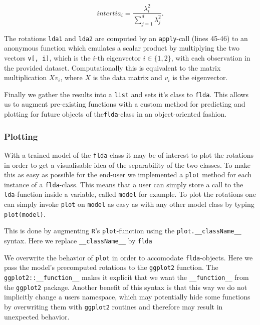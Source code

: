 \documentclass{article}
\begin{document}
\begin{equation}
intertia_i = \frac{\lambda_i^2}{\sum_{j=1}^{d}\lambda_{j}^{2}}.
\end{equation}

The rotations \texttt{lda1} and \texttt{lda2} are computed by an \texttt{apply}-call (lines 45-46) to an anonymous function which emulates a scalar product by multiplying the two vectors \texttt{v[, i]}, which is the $i$-th eigenvector $i \in \{1, 2\}$, with each observation in the provided dataset. Computationally this is equivalent to the matrix multiplication $Xv_i$, where $X$ is the data matrix and $v_i$ is the eigenvector.

Finally we gather the results into a \texttt{list} and sets it's class to \texttt{flda}. This allows us to augment pre-existing functions with a custom method for predicting and plotting for future objects of the\texttt{flda}-class in an object-oriented fashion.

\subsubsection{Plotting}

With a trained model of the \texttt{flda}-class it may be of interest to plot the rotations in order to get a visualisable idea of the separability of the two classes. To make this as easy as possible for the end-user we implemented a \texttt{plot} method for each instance of a \texttt{flda}-class. This means that a user can simply store a call to the \texttt{lda}-function inside a variable, called \texttt{model} for example. To plot the rotations one can simply invoke \texttt{plot} on \texttt{model} as easy as with any other model class by typing \texttt{plot(model)}.

This is done by augmenting \texttt{R}'s \texttt{plot}-function using the \texttt{plot.\_\_className\_\_} syntax. Here we replace \texttt{\_\_className\_\_} by \texttt{flda}



We overwrite the behavior of \texttt{plot} in order to accomodate \texttt{flda}-objects. Here we pass the model's precomputed rotations to the \texttt{ggplot2} function. The \texttt{ggplot2::\_\_function\_\_} makes it explicit that we want the \texttt{\_\_function\_\_} from the \texttt{ggplot2} package. Another benefit of this syntax is that this way we do not implicitly change a users namespace, which may potentially hide some functions by overwriting them with \texttt{ggplot2} routines and therefore may result in unexpected behavior.
\end{document}
